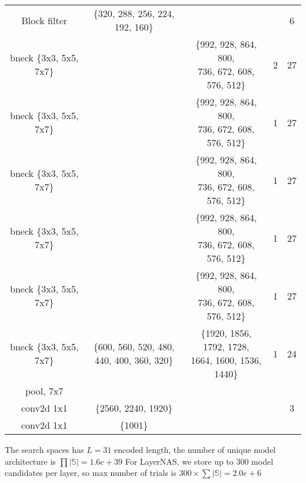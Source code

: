 \begin{table}
\begin{center}
\begin{tabular}[hp]{c|c|c|c|c}
Block filter &\{320, 288, 256, 224, 192, 160\} & & &6 \\
  bneck \{3x3, 5x5, 7x7\} & &\shortstack{\{992, 928, 864, 800, \\ 736, 672, 608, 576, 512\}} &2 &27 \\
  bneck \{3x3, 5x5, 7x7\} & &\shortstack{\{992, 928, 864, 800, \\ 736, 672, 608, 576, 512\}} &1 &27 \\
  bneck \{3x3, 5x5, 7x7\} & &\shortstack{\{992, 928, 864, 800,\\ 736, 672, 608, 576, 512\}} &1 &27 \\
  bneck \{3x3, 5x5, 7x7\} & &\shortstack{\{992, 928, 864, 800, \\736, 672, 608, 576, 512\}} &1 &27 \\
  bneck \{3x3, 5x5, 7x7\} & &\shortstack{\{992, 928, 864, 800,\\ 736, 672, 608, 576, 512\}} &1 &27 \\
\hline
  bneck \{3x3, 5x5, 7x7\} &\shortstack{\{600, 560, 520, 480,\\ 440, 400, 360, 320\}} &\shortstack{\{1920, 1856, 1792, 1728,\\ 1664, 1600, 1536, 1440\}} &1 &24 \\
\hline
  pool, 7x7  & & &\\
  conv2d 1x1  &\{2560, 2240, 1920\} & & &3\\
  conv2d 1x1 &\{1001\} & & \\
\hline
\hline

\end{tabular}
\end{center}
\end{table}

The search spaces has $L=31$ encoded length, the number of unique model architecture is $\prod |\mathbb{S}| = 1.6e+39$
For LayerNAS, we store up to 300 model candidates per layer, so max number of trials is $300 \times {\sum{|\mathbb{S}|}} = 2.0e+6$



